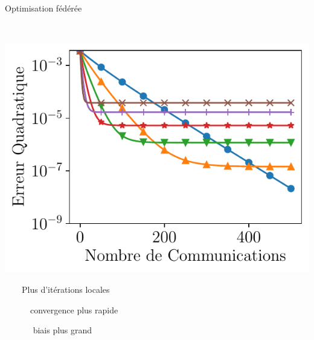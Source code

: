 \documentclass[aspectratio=169,12pt]{beamer}
\newcommand{\cmark}{\ding{51}}%
\newcommand{\xmark}{\ding{55}}%
\begin{document}
\begin{frame}[t]{Optimisation fédérée ~~~  ~~}
\begin{minipage}{0.5\linewidth}
  \end{minipage}~%
  \begin{minipage}{0.48\linewidth}
  \pause
       \begin{center}
    \includegraphics[width=0.75\linewidth]{images/local_training_heterogeneous.pdf}%
  \end{center}
  
    \vspace{-0.5em}

  ~~~~Plus d'itérations locales

    \vspace{0.5em}
    
    ~~~~~{\large \textcolor{green} \cmark}\, convergence plus rapide
    
    ~~~~~{\large \textcolor{red} \xmark}~ biais plus grand

  \end{minipage}

  \vspace{1.5em}


\end{frame}
\end{document}
